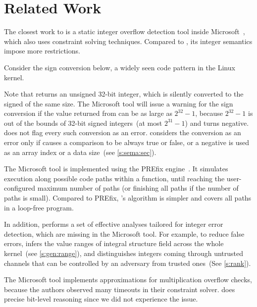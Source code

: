 \section{Related Work}
\label{s:relwk}

The closest work to \sys is a static integer overflow detection
tool inside Microsoft~\cite{moy:z3prefix}, which also uses
constraint solving techniques.
Compared to \sys, its integer semantics impose more restrictions.

Consider the sign conversion below, a widely seen code pattern in
the Linux kernel.

Note that  returns an unsigned 32-bit integer, which
is silently converted to the signed  of the same size.
The Microsoft tool will issue a warning for the sign conversion if
the value returned from  can be as large as $2^{32}
- 1$, because $2^{32} - 1$ is out of the bounds of 32-bit signed
integers~(at most $2^{31} - 1$) and turns  negative.
%
\sys does not flag every such conversion as an error.  \sys considers
the conversion as an error only if  causes a comparison
to be always true or false, or a negative  is used as
an array index or a data size~(see \autoref{s:sema:sec}).

The Microsoft tool is implemented using the PREfix
engine~\cite{bush:prefix}.  It simulates execution along possible
code paths within a function, until reaching
the user-configured maximum number of paths (or finishing all paths
if the number of paths is small).
%
Compared to PREfix, \sys's algorithm is simpler
and covers all paths in a loop-free program.
\fi

In addition, \sys performs a set of effective analyses
tailored for integer error detection, which are missing in the
Microsoft tool.  For example, to reduce false errors, \sys infers
the value ranges of integral structure field across the whole
kernel~(see \autoref{s:gen:range}), and distinguishes integers coming
through untrusted channels that can be controlled by an adversary
from trusted ones~(See \autoref{s:rank}).

The Microsoft tool implements approximations for multiplication
overflow checks, because the authors observed many timeouts in their
constraint solver.  \sys does precise bit-level reasoning
since we did not experience the issue.
\fi


